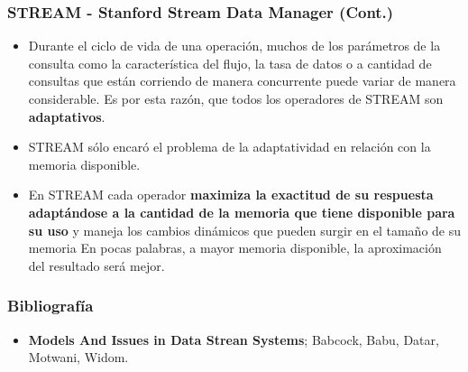 \begin{frame}
\frametitle{STREAM - Stanford Stream Data Manager (Cont.)}
\begin{itemize}
\item Durante el ciclo de vida de una operación, muchos de los parámetros de la consulta como la característica del flujo, la tasa de datos o a cantidad de consultas que están corriendo de manera concurrente puede variar de manera considerable. Es por esta razón, que todos los operadores de STREAM son \textbf{adaptativos}.
\item STREAM sólo encaró el problema de la adaptatividad en relación con la memoria disponible.
\item En STREAM cada operador \textbf{maximiza la exactitud de su respuesta adaptándose a la cantidad de la memoria que tiene disponible para su uso} y maneja los cambios dinámicos que pueden surgir en el tamaño de su memoria En pocas palabras, a mayor memoria disponible, la aproximación del resultado será mejor.
\end{itemize}
\end{frame}


\begin{frame}
\frametitle{Bibliografía}
\begin{itemize}
\item \textbf{Models And Issues in Data Strean Systems}; Babcock, Babu, Datar, Motwani, Widom.
\end{itemize}
\end{frame}
